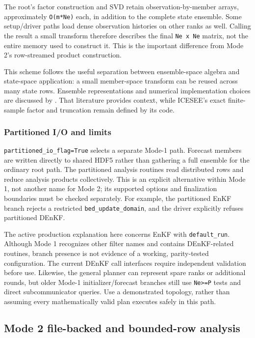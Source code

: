 \documentclass[11pt,a4paper]{article}
\newcommand{\code}[1]{\nolinkurl{#1}}
\begin{document}
The root's factor construction and SVD retain observation-by-member arrays, approximately \code{O(m*Ne)} each, in addition to the complete state ensemble. Some setup/driver paths load dense observation histories on other ranks as well. Calling the result a small transform therefore describes the final \code{Ne x Ne} matrix, not the entire memory used to construct it. This is the important difference from Mode 2's row-streamed product construction.


This scheme follows the useful separation between ensemble-space algebra and state-space application: a small member-space transform can be reused across many state rows. Ensemble representations and numerical implementation choices are discussed by \citet{evensen2003}. That literature provides context, while ICESEE's exact finite-sample factor and truncation remain defined by its code.

\subsubsection{Partitioned I/O and limits}

\code{partitioned_io_flag=True} selects a separate Mode-1 path. Forecast members are written directly to shared HDF5 rather than gathering a full ensemble for the ordinary root path. The partitioned analysis routines read distributed rows and reduce analysis products collectively. This is an explicit alternative within Mode 1, not another name for Mode 2; its supported options and finalization boundaries must be checked separately. For example, the partitioned EnKF branch rejects a restricted \code{bed_update_domain}, and the driver explicitly refuses partitioned DEnKF.

The active production explanation here concerns EnKF with \code{default_run}. Although Mode 1 recognizes other filter names and contains DEnKF-related routines, branch presence is not evidence of a working, parity-tested configuration. The current DEnKF call interfaces require independent validation before use. Likewise, the general planner can represent spare ranks or additional rounds, but older Mode-1 initializer/forecast branches still use \code{Ne>=P} tests and direct subcommunicator queries. Use a demonstrated topology, rather than assuming every mathematically valid plan executes safely in this path.

\subsection{Mode 2 file-backed and bounded-row analysis}
\end{document}
